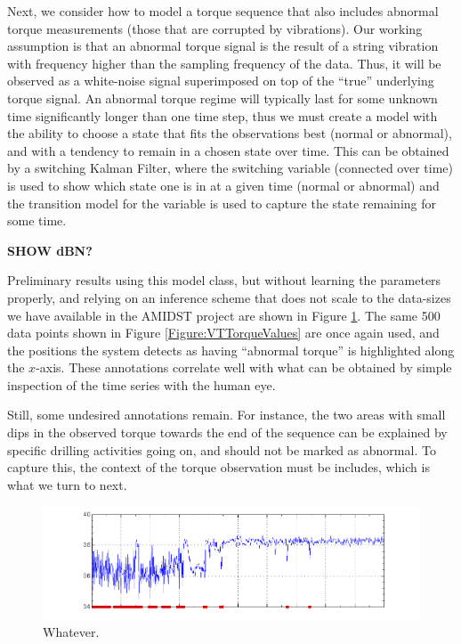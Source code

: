 Next, we consider how to model a torque sequence that also includes  abnormal torque measurements (those that are corrupted by vibrations). 
Our working assumption is that an abnormal torque signal is the result of a string vibration with  frequency higher than the sampling frequency of the data. 
Thus, it will be observed as a white-noise signal superimposed on top of the ``true'' underlying torque signal. An abnormal torque regime will typically last for some unknown time significantly longer than one time step, thus we must create a model with the ability to choose a state that fits the observations best (normal or abnormal), and with a tendency to remain in a chosen state over time. This can be obtained by a switching Kalman Filter, where the switching variable (connected over time) is used to show which state one is in at a given time (normal or abnormal) and the transition model for the variable is used to capture the state remaining for some time. 

{\bf SHOW dBN?}

Preliminary results using this model class, but without learning the parameters properly, and relying on an inference scheme that does not scale to the data-sizes we have available in the AMIDST project are shown in Figure \ref{Figure:VTEraticTorqueMarked}. The same 500 data points shown  in Figure \ref{Figure:VTTorqueValues} are once again used, and the positions the system detects as having ``abnormal torque'' is highlighted along the $x$-axis. These annotations correlate well with what can be obtained by simple inspection of the time series with the human eye. 

Still, some undesired annotations remain. For instance, the two areas with small dips in the observed torque towards the end of the sequence can be explained by specific drilling activities going on, and should not be marked as abnormal. To capture this, the context of the torque observation must be includes, which is what we turn to next.


\begin{figure}
\begin{center}
\includegraphics[scale=0.3]{./figures/VT_ErraticTRQ_marked} 
\caption{\label{Figure:VTEraticTorqueMarked}  Whatever.}
\end{center}
\end{figure}

